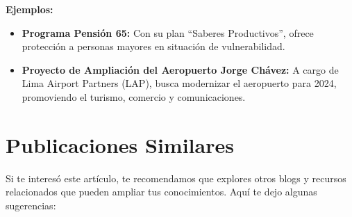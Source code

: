 \documentclass[
  jou,
  floatsintext,
  longtable,
  a4paper,
  nolmodern,
  notxfonts,
  notimes,
  colorlinks=true,linkcolor=blue,citecolor=blue,urlcolor=blue]{apa7}
\providecommand{\tightlist}{%
  \setlength{\itemsep}{0pt}\setlength{\parskip}{0pt}}
\begin{document}
\textbf{Ejemplos:}

\begin{itemize}
\tightlist
\item
  \textbf{Programa Pensión 65:} Con su plan ``Saberes Productivos'',
  ofrece protección a personas mayores en situación de vulnerabilidad.
\item
  \textbf{Proyecto de Ampliación del Aeropuerto Jorge Chávez:} A cargo
  de Lima Airport Partners (LAP), busca modernizar el aeropuerto para
  2024, promoviendo el turismo, comercio y comunicaciones.
\end{itemize}

\section{Publicaciones Similares}\label{publicaciones-similares}

Si te interesó este artículo, te recomendamos que explores otros blogs y
recursos relacionados que pueden ampliar tus conocimientos. Aquí te dejo
algunas sugerencias:
\end{document}
